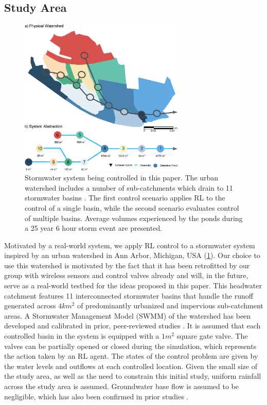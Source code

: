\subsection{Study Area}
\begin{figure}
    \centering
    \includegraphics[width=0.7\textwidth]{gfx/Chapter-3/casestudy_fig_2.eps}
    \caption{Stormwater system being controlled in this paper. The urban watershed includes a number of sub-catchments which drain to 11 stormwater basins . The first control scenario applies RL to the control of a single basin, while the second scenario evaluates control of multiple basins.  Average volumes experienced by the ponds during a 25 year 6 hour storm event are presented.}
    \label{fig:2}
\end{figure}


Motivated by a real-world system, we apply RL control to a stormwater system inspired by an urban watershed in Ann Arbor, Michigan, USA (\ref{fig:2}). Our choice to use this watershed is motivated by the fact that it has been retrofitted by our group with wireless sensors and control valves already \cite{bartos2017open} and will, in the future, serve as a real-world testbed for the ideas proposed in this paper. This headwater catchment features 11 interconnected stormwater basins that handle the runoff generated across $4km^2$   of predominantly urbanized and impervious sub-catchment areas.   A Stormwater Management Model (SWMM) of the watershed has been developed and calibrated in prior, peer-reviewed studies \cite{wong2018real}. It is assumed that each controlled basin in the system is equipped with a $1m^2$ square gate valve. The valves can be partially opened or closed during the simulation, which represents the action taken by an RL agent. The states of the control problem are given by the water levels and outflows at each controlled location. Given the small size of the study area, as well as the need to constrain this initial study, uniform rainfall across the study area is assumed. Groundwater base flow is assumed to be negligible, which has also been confirmed in prior studies \cite{wong2018real}.

